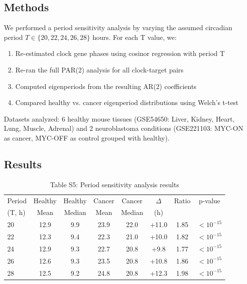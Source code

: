 \documentclass[11pt,a4paper]{article}
\begin{document}
\subsection{Methods}

We performed a period sensitivity analysis by varying the assumed circadian period $T \in \{20, 22, 24, 26, 28\}$ hours. For each T value, we:

\begin{enumerate}
    \item Re-estimated clock gene phases using cosinor regression with period T
    \item Re-ran the full PAR(2) analysis for all clock-target pairs
    \item Computed eigenperiods from the resulting AR(2) coefficients
    \item Compared healthy vs. cancer eigenperiod distributions using Welch's t-test
\end{enumerate}

Datasets analyzed: 6 healthy mouse tissues (GSE54650: Liver, Kidney, Heart, Lung, Muscle, Adrenal) and 2 neuroblastoma conditions (GSE221103: MYC-ON as cancer, MYC-OFF as control grouped with healthy).

\subsection{Results}

\begin{table}[H]
\centering
\caption{Table S5: Period sensitivity analysis results}
\label{tab:period_sens_supp}
\begin{tabular}{lccccccc}
\toprule
Period & Healthy & Healthy & Cancer & Cancer & $\Delta$ & Ratio & p-value \\
(T, h) & Mean & Median & Mean & Median & (h) & & \\
\midrule
20 & 12.9 & 9.9 & 23.9 & 22.0 & +11.0 & 1.85 & $<10^{-15}$ \\
22 & 12.3 & 9.4 & 22.3 & 21.0 & +10.0 & 1.82 & $<10^{-15}$ \\
24 & 12.9 & 9.3 & 22.7 & 20.8 & +9.8 & 1.77 & $<10^{-15}$ \\
26 & 12.6 & 9.3 & 23.5 & 20.8 & +10.8 & 1.86 & $<10^{-15}$ \\
28 & 12.5 & 9.2 & 24.8 & 20.8 & +12.3 & 1.98 & $<10^{-15}$ \\
\bottomrule
\end{tabular}
\end{table}
\end{document}
